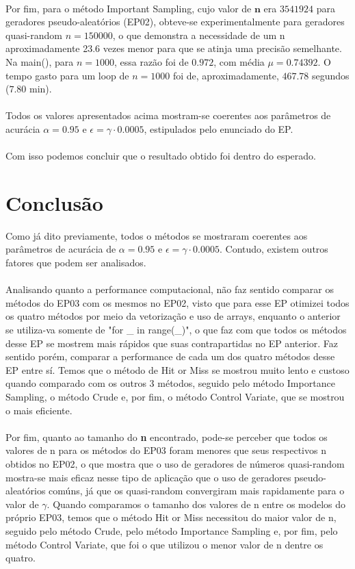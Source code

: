\documentclass{article}
\begin{document}
\\
Por fim, para o método Important Sampling, cujo valor de $\textbf{n}$ era $3541924$ para geradores pseudo-aleatórios (EP02), obteve-se experimentalmente para geradores quasi-random $n = 150000$, o que demonstra a necessidade de um n aproximadamente 23.6 vezes menor para que se atinja uma precisão semelhante. Na main(), para $n = 1000$, essa razão foi de $0.972$, com média $\mu = 0.74392$. O tempo gasto para um loop de $n = 1000$ foi de, aproximadamente, $467.78$ segundos ($7.80$ min).\\
\\
Todos os valores apresentados acima mostram-se coerentes aos parâmetros de acurácia $\alpha = 0.95$ e $\epsilon = \gamma \cdot0.0005$, estipulados pelo enunciado do EP. \\
\\
Com isso podemos concluir que o resultado obtido foi dentro do esperado.

\section{Conclusão}

Como já dito previamente, todos o métodos se mostraram coerentes aos parâmetros de acurácia de $\alpha = 0.95$ e $\epsilon = \gamma \cdot0.0005$. Contudo, existem outros fatores que podem ser analisados.\\
\\
Analisando quanto a performance computacional, não faz sentido comparar os métodos do EP03 com os mesmos no EP02, visto que para esse EP otimizei todos os quatro métodos por meio da vetorização e uso de arrays, enquanto o anterior se utiliza-va somente de "for \_ in range(\_)", o que faz com que todos os métodos desse EP se mostrem mais rápidos que suas contrapartidas no EP anterior. Faz sentido porém, comparar a performance de cada um dos quatro métodos desse EP entre sí. Temos que o método de Hit or Miss se mostrou muito lento e custoso quando comparado com os outros 3 métodos, seguido pelo método Importance Sampling, o método Crude e, por fim, o método Control Variate, que se mostrou o mais eficiente.\\
\\
Por fim, quanto ao tamanho do \textbf{n} encontrado, pode-se perceber que todos os valores de n para os métodos do EP03 foram menores que seus respectivos n obtidos no EP02, o que mostra que o uso de geradores de números quasi-random mostra-se mais eficaz nesse tipo de aplicação que o uso de geradores pseudo-aleatórios comúns, já que os quasi-random convergiram mais rapidamente para o valor de $\gamma$. Quando comparamos o tamanho dos valores de n entre os modelos do próprio EP03, temos que o método Hit or Miss necessitou do maior valor de n, seguido pelo método Crude, pelo método Importance Sampling e, por fim, pelo método Control Variate, que foi o que utilizou o menor valor de n dentre os quatro.
\end{document}
